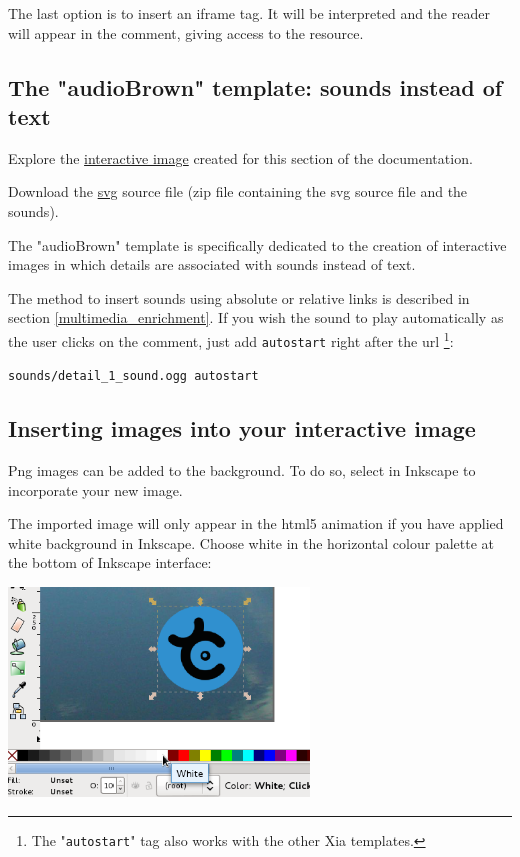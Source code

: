 The last option is to insert an iframe tag.
It will be interpreted and the reader will appear in the comment, 
giving access to the resource.

\subsection{The "audioBrown" template: sounds instead of text}\label{audioBrownsection}

\begin{links}
Explore the \href{http://xia.dane.ac-versailles.fr/demo/tuto/xia4}{interactive image} created for this section of the documentation.

Download the \href{http://xia.dane.ac-versailles.fr/demo/tuto/xia4/svg/xia4.zip}{svg} source file (zip file containing the svg source file
and the sounds).
\end{links}

The "audioBrown" template is specifically dedicated to the creation of 
interactive images in which details are associated with sounds instead of text.

The method to insert sounds using absolute or relative links is described in 
section 
\ref{multimedia_enrichment}. If you wish the sound to play 
automatically as the user clicks on the comment, just add \verb|autostart| right 
after the url \footnote{The "\texttt{autostart}" tag also works with the other 
Xia templates.}:\\
\begin{center}
 \verb|sounds/detail_1_sound.ogg autostart|
\end{center}


\subsection{Inserting images into your interactive image}\label{insertion_images}

Png images can be added to the background. To do so, select  in 
Inkscape to incorporate your new image.

The imported image will only appear in the html5 animation if you have applied white background in 
Inkscape. Choose white in the horizontal colour palette at the bottom of 
Inkscape interface:\\

\begin{center}
\includegraphics[width=0.6\textwidth]{images/white_fill}\\ 
\end{center}


